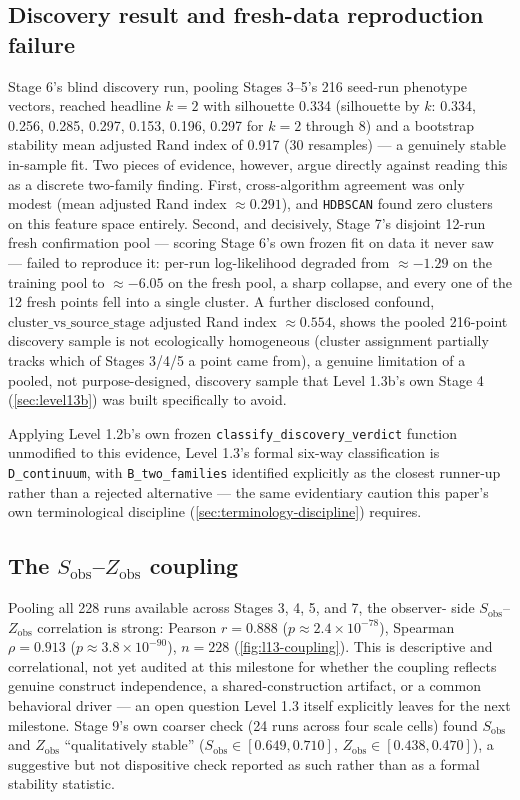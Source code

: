 \subsection{Discovery result and fresh-data reproduction failure}
\label{sec:level13-discovery}

Stage 6's blind discovery run, pooling Stages 3--5's 216 seed-run phenotype
vectors, reached headline $k=2$ with silhouette 0.334 (silhouette by $k$:
0.334, 0.256, 0.285, 0.297, 0.153, 0.196, 0.297 for $k=2$ through 8) and a
bootstrap stability mean adjusted Rand index of 0.917 (30 resamples) ---
a genuinely stable in-sample fit. Two pieces of evidence, however, argue
directly against reading this as a discrete two-family finding. First,
cross-algorithm agreement was only modest (mean adjusted Rand index
$\approx0.291$), and \texttt{HDBSCAN} found zero clusters on this feature
space entirely. Second, and decisively, Stage 7's disjoint 12-run fresh
confirmation pool --- scoring Stage 6's own frozen fit on data it never
saw --- failed to reproduce it: per-run log-likelihood degraded from
$\approx-1.29$ on the training pool to $\approx-6.05$ on the fresh pool, a
sharp collapse, and every one of the 12 fresh points fell into a single
cluster. A further disclosed confound, $\text{cluster\_vs\_source\_stage}$
adjusted Rand index $\approx0.554$, shows the pooled 216-point discovery
sample is not ecologically homogeneous (cluster assignment partially
tracks which of Stages 3/4/5 a point came from), a genuine limitation of a
pooled, not purpose-designed, discovery sample that Level 1.3b's own Stage
4 (\cref{sec:level13b}) was built specifically to avoid.

Applying Level 1.2b's own frozen \texttt{classify\_discovery\_verdict}
function unmodified to this evidence, Level 1.3's formal six-way
classification is \texttt{D\_continuum}, with \texttt{B\_two\_families}
identified explicitly as the closest runner-up rather than a rejected
alternative --- the same evidentiary caution this paper's own
terminological discipline (\cref{sec:terminology-discipline}) requires.

\subsection{\texorpdfstring{The $S_{\text{obs}}$--$Z_{\text{obs}}$ coupling}{The S\_obs--Z\_obs coupling}}
\label{sec:level13-coupling}

Pooling all 228 runs available across Stages 3, 4, 5, and 7, the observer-
side $S_{\text{obs}}$--$Z_{\text{obs}}$ correlation is strong: Pearson
$r=0.888$ ($p\approx2.4\times10^{-78}$), Spearman $\rho=0.913$
($p\approx3.8\times10^{-90}$), $n=228$ (\cref{fig:l13-coupling}). This is
descriptive and correlational, not yet audited at this milestone for
whether the coupling reflects genuine construct independence, a
shared-construction artifact, or a common behavioral driver --- an open
question Level 1.3 itself explicitly leaves for the next milestone. Stage
9's own coarser check (24 runs across four scale cells) found
$S_{\text{obs}}$ and $Z_{\text{obs}}$ ``qualitatively stable''
($S_{\text{obs}}\in[0.649,0.710]$, $Z_{\text{obs}}\in[0.438,0.470]$), a
suggestive but not dispositive check reported as such rather than as a
formal stability statistic.


